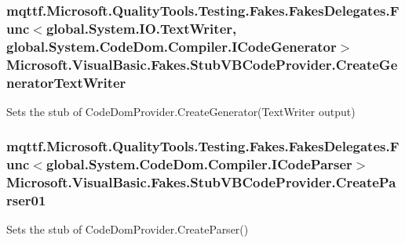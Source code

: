 \hypertarget{class_microsoft_1_1_visual_basic_1_1_fakes_1_1_stub_v_b_code_provider_ae44ee224314def5f9720e2a0aa1d1540}{
\subsubsection[{Create\-Generator\-Text\-Writer}]{\setlength{\rightskip}{0pt plus 5cm}mqttf.\-Microsoft.\-Quality\-Tools.\-Testing.\-Fakes.\-Fakes\-Delegates.\-Func$<$global.\-System.\-I\-O.\-Text\-Writer, global.\-System.\-Code\-Dom.\-Compiler.\-I\-Code\-Generator$>$ Microsoft.\-Visual\-Basic.\-Fakes.\-Stub\-V\-B\-Code\-Provider.\-Create\-Generator\-Text\-Writer}}\label{class_microsoft_1_1_visual_basic_1_1_fakes_1_1_stub_v_b_code_provider_ae44ee224314def5f9720e2a0aa1d1540}


Sets the stub of Code\-Dom\-Provider.\-Create\-Generator(\-Text\-Writer output)

\hypertarget{class_microsoft_1_1_visual_basic_1_1_fakes_1_1_stub_v_b_code_provider_a46186531ad8f299045f7ecb69fb80a65}{
\subsubsection[{Create\-Parser01}]{\setlength{\rightskip}{0pt plus 5cm}mqttf.\-Microsoft.\-Quality\-Tools.\-Testing.\-Fakes.\-Fakes\-Delegates.\-Func$<$global.\-System.\-Code\-Dom.\-Compiler.\-I\-Code\-Parser$>$ Microsoft.\-Visual\-Basic.\-Fakes.\-Stub\-V\-B\-Code\-Provider.\-Create\-Parser01}}\label{class_microsoft_1_1_visual_basic_1_1_fakes_1_1_stub_v_b_code_provider_a46186531ad8f299045f7ecb69fb80a65}


Sets the stub of Code\-Dom\-Provider.\-Create\-Parser()

